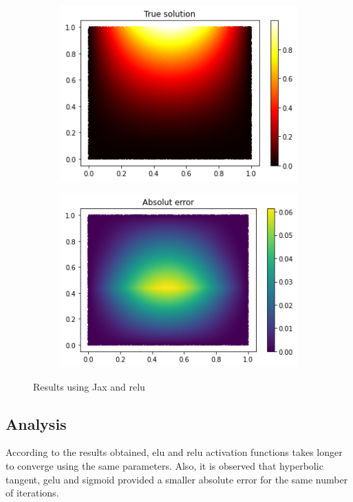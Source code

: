 \begin{figure}[H]
\begin{subfigure}{.45\textwidth}
    \includegraphics[width=.8\linewidth]{images/NN_Jax_PDE8_files_relu/NN_Jax_PDE8_22_0.png}
    \label{fig:sub3}
    \end{subfigure}
\begin{subfigure}{.45\textwidth}
    \centering
    \includegraphics[width=.8\linewidth]{images/NN_Jax_PDE8_files_relu/NN_Jax_PDE8_24_0.png}
    \label{fig:sub4}
\end{subfigure}
\caption{Results using Jax and relu}
\label{fig:test}
\end{figure}


\vspace{-0.5cm}
\subsection{Analysis}
According to the results obtained, elu and relu activation functions takes longer to converge using the same parameters. Also, it is observed that hyperbolic tangent, gelu and sigmoid provided a smaller absolute error for the same number of iterations.
\newpage

